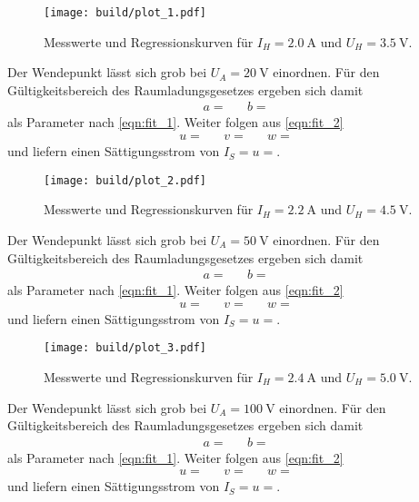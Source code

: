 \begin{figure}[H]
	\texttt{[image: build/plot\_1.pdf]}
	\caption{Messwerte und Regressionskurven für $I_H = \qty{2.0}{\ampere}$ und $U_H = \qty{3.5}{\volt}$.}
	\label{fig:plot_1}
\end{figure}

Der Wendepunkt lässt sich grob bei $U_A = \qty{20}{\volt}$ einordnen. Für den Gültigkeitsbereich des Raumladungsgesetzes
ergeben sich damit
\begin{align*}
	a =  && b = 
\end{align*}
als Parameter nach \eqref{eqn:fit_1}. Weiter folgen aus \eqref{eqn:fit_2}
\begin{align*}
	u =  && v =  && w = 
\end{align*}
und liefern einen Sättigungsstrom von $I_S = u = $. 

\begin{figure}[H]
	\texttt{[image: build/plot\_2.pdf]}
	\caption{Messwerte und Regressionskurven für $I_H = \qty{2.2}{\ampere}$ und $U_H = \qty{4.5}{\volt}$.}
	\label{fig:plot_2}
\end{figure}

Der Wendepunkt lässt sich grob bei $U_A = \qty{50}{\volt}$ einordnen. Für den Gültigkeitsbereich des Raumladungsgesetzes
ergeben sich damit
\begin{align*}
	a =  && b = 
\end{align*}
als Parameter nach \eqref{eqn:fit_1}. Weiter folgen aus \eqref{eqn:fit_2}
\begin{align*}
	u =  && v =  && w = 
\end{align*}
und liefern einen Sättigungsstrom von $I_S = u = $. 

\begin{figure}[H]
	\texttt{[image: build/plot\_3.pdf]}
	\caption{Messwerte und Regressionskurven für $I_H = \qty{2.4}{\ampere}$ und $U_H = \qty{5.0}{\volt}$.}
	\label{fig:plot_3}
\end{figure}

Der Wendepunkt lässt sich grob bei $U_A = \qty{100}{\volt}$ einordnen. Für den Gültigkeitsbereich des Raumladungsgesetzes
ergeben sich damit
\begin{align*}
	a =  && b = 
\end{align*}
als Parameter nach \eqref{eqn:fit_1}. Weiter folgen aus \eqref{eqn:fit_2}
\begin{align*}
	u =  && v =  && w = 
\end{align*}
und liefern einen Sättigungsstrom von $I_S = u = $. 

